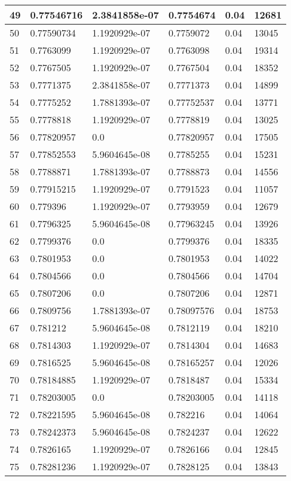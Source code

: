 \begin{longtable}{|l|l|l|l|l|l|}
49 & 0.77546716 & 2.3841858e-07 & 0.7754674 & 0.04 & 12681 \\ \hline 
50 & 0.77590734 & 1.1920929e-07 & 0.7759072 & 0.04 & 13045 \\ \hline 
51 & 0.7763099 & 1.1920929e-07 & 0.7763098 & 0.04 & 19314 \\ \hline 
52 & 0.7767505 & 1.1920929e-07 & 0.7767504 & 0.04 & 18352 \\ \hline 
53 & 0.7771375 & 2.3841858e-07 & 0.7771373 & 0.04 & 14899 \\ \hline 
54 & 0.7775252 & 1.7881393e-07 & 0.77752537 & 0.04 & 13771 \\ \hline 
55 & 0.7778818 & 1.1920929e-07 & 0.7778819 & 0.04 & 13025 \\ \hline 
56 & 0.77820957 & 0.0 & 0.77820957 & 0.04 & 17505 \\ \hline 
57 & 0.77852553 & 5.9604645e-08 & 0.7785255 & 0.04 & 15231 \\ \hline 
58 & 0.7788871 & 1.7881393e-07 & 0.7788873 & 0.04 & 14556 \\ \hline 
59 & 0.77915215 & 1.1920929e-07 & 0.7791523 & 0.04 & 11057 \\ \hline 
60 & 0.779396 & 1.1920929e-07 & 0.7793959 & 0.04 & 12679 \\ \hline 
61 & 0.7796325 & 5.9604645e-08 & 0.77963245 & 0.04 & 13926 \\ \hline 
62 & 0.7799376 & 0.0 & 0.7799376 & 0.04 & 18335 \\ \hline 
63 & 0.7801953 & 0.0 & 0.7801953 & 0.04 & 14022 \\ \hline 
64 & 0.7804566 & 0.0 & 0.7804566 & 0.04 & 14704 \\ \hline 
65 & 0.7807206 & 0.0 & 0.7807206 & 0.04 & 12871 \\ \hline 
66 & 0.7809756 & 1.7881393e-07 & 0.78097576 & 0.04 & 18753 \\ \hline 
67 & 0.781212 & 5.9604645e-08 & 0.7812119 & 0.04 & 18210 \\ \hline 
68 & 0.7814303 & 1.1920929e-07 & 0.7814304 & 0.04 & 14683 \\ \hline 
69 & 0.7816525 & 5.9604645e-08 & 0.78165257 & 0.04 & 12026 \\ \hline 
70 & 0.78184885 & 1.1920929e-07 & 0.7818487 & 0.04 & 15334 \\ \hline 
71 & 0.78203005 & 0.0 & 0.78203005 & 0.04 & 14118 \\ \hline 
72 & 0.78221595 & 5.9604645e-08 & 0.782216 & 0.04 & 14064 \\ \hline 
73 & 0.78242373 & 5.9604645e-08 & 0.7824237 & 0.04 & 12622 \\ \hline 
74 & 0.7826165 & 1.1920929e-07 & 0.7826166 & 0.04 & 12845 \\ \hline 
75 & 0.78281236 & 1.1920929e-07 & 0.7828125 & 0.04 & 13843 \\ \hline 
\end{longtable}
